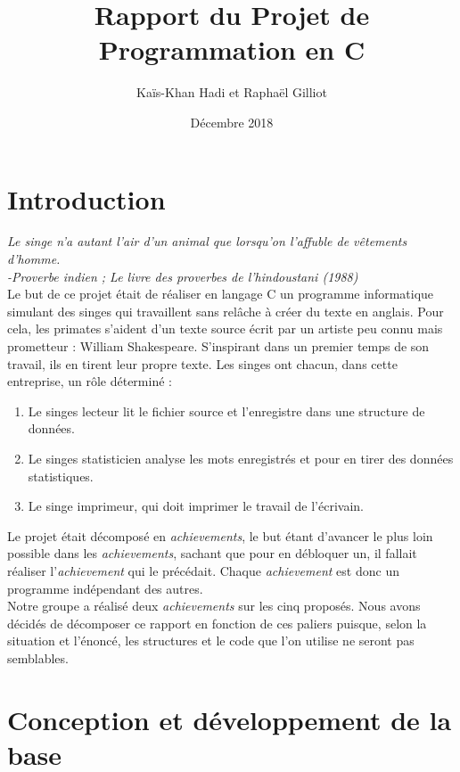 \documentclass{article}
\title{Rapport du Projet de Programmation en C}
\author{Kaïs-Khan Hadi et Raphaël Gilliot}
\date{Décembre 2018}
\begin{document}
\maketitle

\newpage
\tableofcontents
\newpage

\section{Introduction}

\emph{Le singe n’a autant l'air d'un animal que lorsqu'on l'affuble de vêtements d'homme.\\
-Proverbe indien ; Le livre des proverbes de l'hindoustani (1988)}\\

Le but de ce projet était de réaliser en langage C un programme informatique simulant des singes qui travaillent sans relâche à créer du texte en anglais.
Pour cela, les primates s'aident d'un texte source écrit par un artiste peu connu mais prometteur : William Shakespeare. S'inspirant dans un premier temps de son travail, ils en tirent leur propre texte. Les singes ont chacun, dans cette entreprise, un rôle déterminé :
\begin{enumerate}
    \item Le singes lecteur lit le fichier source et l'enregistre dans une structure de données.
    \item Le singes statisticien analyse les mots enregistrés et pour en tirer des données statistiques.
    \item Le singe imprimeur, qui doit imprimer le travail de l'écrivain.
\end{enumerate}

Le projet était décomposé en \emph{achievements}, le but étant d'avancer le plus loin possible dans les \emph{achievements}, sachant que pour en débloquer un, il fallait réaliser l'\emph{achievement} qui le précédait. Chaque \emph{achievement} est donc un programme indépendant des autres. \\
Notre groupe a réalisé deux \emph{achievements} sur les cinq proposés.
Nous avons décidés de décomposer ce rapport en fonction de ces paliers puisque, selon la situation et l'énoncé, les structures et le code que l'on utilise ne seront pas semblables. 

\newpage

\section{Conception et développement de la base}
\end{document}
